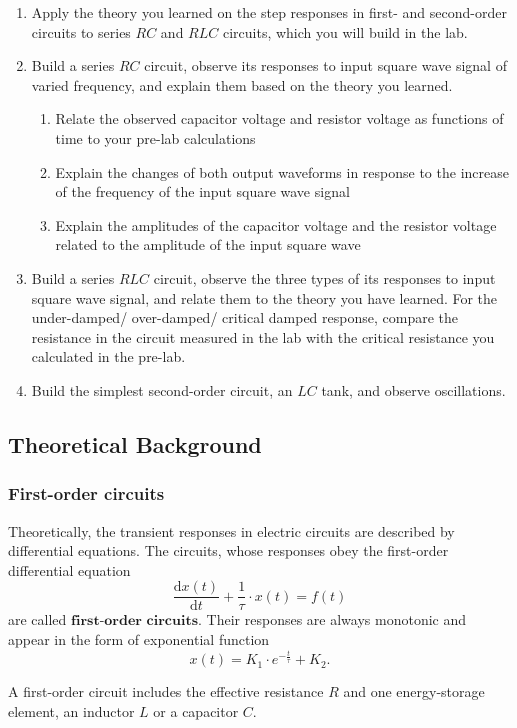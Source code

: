 \documentclass{article}
\begin{document}
\begin{enumerate}
\item Apply the theory you learned on the step responses in first- and second-order circuits to series $RC$ and $RLC$ circuits, which you will build in the lab. 
\item Build  a series $RC$ circuit,  observe its responses  to input  square wave signal of varied frequency, and explain them based on the theory you learned.
\begin{enumerate}
\item Relate the observed capacitor voltage and resistor voltage as functions of time to your pre-lab calculations
\item Explain the changes of both output waveforms in response to the increase of the frequency of the input square wave signal
\item Explain the amplitudes of the capacitor voltage and the resistor voltage related to the amplitude of the input square wave
\end{enumerate}
\item Build a series $RLC$ circuit, observe the three types of its responses to input square wave signal, and relate them to the theory you have learned. For the under-damped/ over-damped/ critical damped response, compare the resistance in the circuit measured in the lab with the critical resistance you calculated in the pre-lab. 
\item Build the simplest second-order circuit, an $LC$ tank, and observe oscillations.
\end{enumerate}

	\subsection{Theoretical Background}
		\subsubsection{First-order circuits}

Theoretically, the transient responses in electric circuits are described by differential equations. The circuits, whose responses obey the first-order differential equation 
$$\frac{\mathrm{d}x(t)}{\mathrm{d}t} + \frac{1}{\tau}\cdot x(t) = f(t)$$
are called $\textbf{first-order circuits}$. Their  responses  are always monotonic and appear in the form of exponential function  
$$x(t) = K_1 \cdot e^{-\frac{t}{\tau}} + K_2.$$

A first-order circuit includes the effective resistance $R$ and one energy-storage element, an inductor $L$ or a capacitor $C$.
\end{document}
